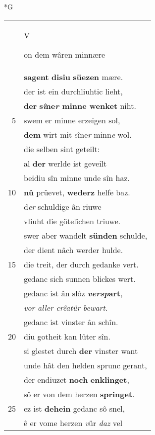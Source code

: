 \documentclass[8pt,a4paper,notitlepage]{article}
\begin{document}
\begin{table}[ht]
\begin{minipage}[t]{0.5\linewidth}
\small
\begin{center}*G
\end{center}
\begin{tabular}{rl}
 & \begin{large}V\end{large}on dem wâren minnære\\ 
 & \textbf{sagent} \textbf{disiu} \textbf{süezen} mære.\\ 
 & der ist ein durchliuhtic lieht,\\ 
 & \textbf{der} \textbf{s\textit{î}ne\textit{r} minne wenket} niht.\\ 
5 & swem er minne erzeigen sol,\\ 
 & \textbf{dem} wirt mit sîne\textit{r} minn\textit{e} wol.\\ 
 & die selben sint geteilt:\\ 
 & al \textbf{der} werlde ist geveilt\\ 
 & beidiu sîn minne unde sîn haz.\\ 
10 & \textbf{nû} prüevet, \textbf{wederz} helfe baz.\\ 
 & d\textit{er} schuldige ân riuwe\\ 
 & vliuht die götelîchen triuwe.\\ 
 & swer aber wandelt \textbf{sünden} schulde,\\ 
 & der dient nâch werder hulde.\\ 
15 & die treit, der durch gedanke vert.\\ 
 & gedanc sich sunnen blickes wert.\\ 
 & gedanc ist ân slôz \textbf{\textit{versp}art},\\ 
 & \textit{vor aller crêatûr bewart}.\\ 
 & gedanc ist vinster ân schîn.\\ 
20 & diu gotheit kan lûter sîn.\\ 
 & si glestet durch \textbf{der} vinster want\\ 
 & unde hât den helden sprunc gerant,\\ 
 & der endiuzet \textbf{noch} \textbf{enklinget},\\ 
 & sô er von dem herzen \textbf{springet}.\\ 
25 & ez ist \textbf{dehein} gedanc sô snel,\\ 
 & ê er vome herzen \textit{v}ür \textit{daz} vel\\ 

\end{tabular}
\end{minipage}
\end{table}
\end{document}
